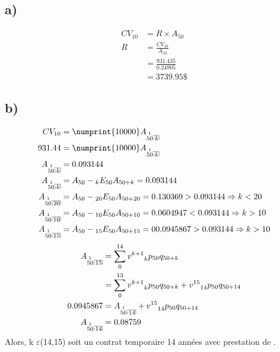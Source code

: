 \documentclass[11pt,french]{report}
\makeatletter
\DeclareRobustCommand{\annuity}[1]{%
\def\arraystretch{0}%
\setlength\arraycolsep{.7pt}%
\setlength\arrayrulewidth{.3pt}%
\begin{array}[b]{@{}c|}\hline
\\[\arraycolsep]%
\scriptstyle #1%
\end{array}%
}
\newcommand{\indiceGauche}[2]{{\vphantom{#2}}_{#1}#2}
\makeatother
\begin{document}
\subsection*{a)}
\begin{align*}
CV_{10} &= R \times A_{50}\\
R &= \frac{CV_{10}}{A_{50}} \\
&= \frac{931.435}{0.24905} \\
&=3739.95 \$
\end{align*}

\subsection*{b)}
\begin{align*}
CV_{10} &= \numprint{10000} A_{\overset{1}{50} \annuity{:k}} \\
931.44 &=  \numprint{10000} A_{\overset{1}{50} \annuity{:k}} \\
A_{\overset{1}{50} \annuity{:k}} &= 0.093144 \\
A_{\overset{1}{50} \annuity{:k}} &= A_{50} - \indiceGauche{k}{E}_{50} A_{50 + k}  = 0.093144 \\
A_{\overset{1}{50} \annuity{:20}} &= A_{50} - \indiceGauche{20}{E}_{50} A_{50 + 20}  = 0.130369 > 0.093144 \Rightarrow k < 20 \\
A_{\overset{1}{50} \annuity{:10}} &= A_{50} - \indiceGauche{10}{E}_{50} A_{50 + 10}  =0.0604947 < 0.093144 \Rightarrow k > 10 \\
A_{\overset{1}{50} \annuity{:15}} &= A_{50} - \indiceGauche{15}{E}_{50} A_{50 + 15}  =00.0945867 > 0.093144 \Rightarrow k > 10 \\
\end{align*}
\begin{align*}
A_{\overset{1}{50} \annuity{:15}} &= \sum_{0}^{14} v^{k+1} \indiceGauche{k}{p}_{50} q_{50 + k} \\
&= \sum_{0}^{13} v^{k+1} \indiceGauche{k}{p}_{50} q_{50 + k} + v^{15} \indiceGauche{14}{p}_{50} q_{50 + 14} \\
0.0945867 &= A_{\overset{1}{50} \annuity{:14}} + v^{15} \indiceGauche{14}{p}_{50} q_{50 + 14} \\
A_{\overset{1}{50} \annuity{:14}} &= 0.08759
\end{align*}
Alors, k $\varepsilon$(14,15) soit un contrat temporaire 14 années avec prestation de .
\end{document}
